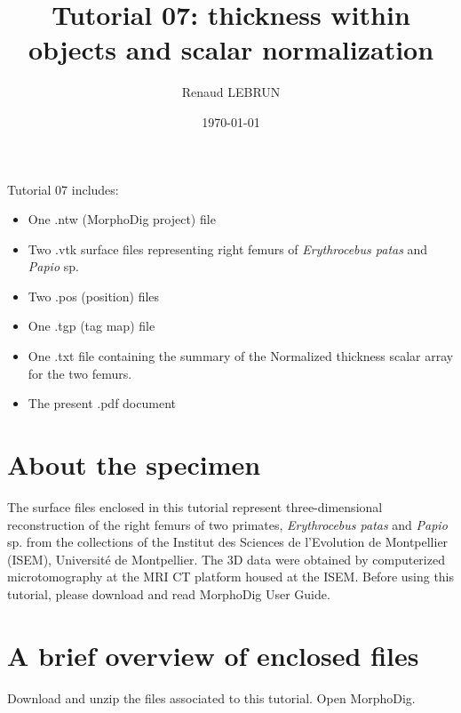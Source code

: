 \documentclass[12pt, a4paper]{book}
\title{Tutorial 07: thickness within objects and scalar normalization}
\author{Renaud LEBRUN}
\affil{Institut des Sciences de l'Evolution, Université de Montpellier, France}
\date{\today}
\begin{document}
	\dominitoc

\maketitle


\faketableofcontents



\minitoc 
Tutorial 07 includes:
\begin{itemize}
\item One .ntw (MorphoDig project) file
\item Two .vtk surface files representing right femurs of \textit{Erythrocebus patas} and \textit{Papio} sp.
\item Two .pos (position) files 
\item One .tgp (tag map) file 
\item One .txt file containing the summary of the Normalized thickness scalar array for the two femurs.
\item The present .pdf document
\end{itemize}



\section{About the specimen}

The surface files enclosed in this tutorial represent three-dimensional reconstruction of the right femurs of two primates, \textit{Erythrocebus patas} and \textit{Papio} sp. from the collections of the Institut des Sciences de l'Evolution de Montpellier (ISEM), Université de Montpellier. The 3D data were obtained by computerized microtomography at the MRI \si{\micro}CT platform housed at the ISEM.
Before using this tutorial, please download and read MorphoDig User Guide. 


\section{A brief overview of enclosed files}
		Download and unzip the files associated to this tutorial. Open MorphoDig.
\end{document}
